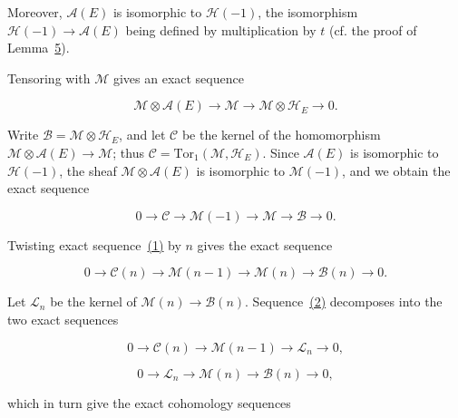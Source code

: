 Moreover, $\mathcal{A}(E)$ is isomorphic to $\mathcal{H}(-1)$, the isomorphism $\mathcal{H}(-1)\to\mathcal{A}(E)$ being defined by multiplication by $t$ (cf. the proof of Lemma~\hyperref[gaga:lemma:5]{5}).

Tensoring with $\mathcal{M}$ gives an exact sequence

\begin{equation*}
\mathcal{M}\otimes\mathcal{A}(E)\longrightarrow\mathcal{M}
\longrightarrow\mathcal{M}\otimes\mathcal{H}_E\longrightarrow0.
\end{equation*}

Write $\mathcal{B}=\mathcal{M}\otimes\mathcal{H}_E$, and let $\mathcal{C}$ be the kernel of the homomorphism $\mathcal{M}\otimes\mathcal{A}(E)\to\mathcal{M}$; thus $\mathcal{C}=\mathrm{Tor}_1(\mathcal{M},\mathcal{H}_E)$. Since $\mathcal{A}(E)$ is isomorphic to $\mathcal{H}(-1)$, the sheaf $\mathcal{M}\otimes\mathcal{A}(E)$ is isomorphic to $\mathcal{M}(-1)$, and we obtain the exact sequence

\begin{equation*}\tag{1}
0\longrightarrow\mathcal{C}\longrightarrow\mathcal{M}(-1)
\longrightarrow\mathcal{M}\longrightarrow\mathcal{B}\longrightarrow0.
\end{equation*}

Twisting exact sequence~\hyperref[gaga:eq:1]{(1)} by $n$ gives the exact sequence

\begin{equation*}\tag{2}
0\longrightarrow\mathcal{C}(n)\longrightarrow\mathcal{M}(n-1)
\longrightarrow\mathcal{M}(n)\longrightarrow\mathcal{B}(n)\longrightarrow0.
\end{equation*}

Let $\mathcal{L}_n$ be the kernel of $\mathcal{M}(n)\to\mathcal{B}(n)$. Sequence~\hyperref[gaga:eq:2]{(2)} decomposes into the two exact sequences

\begin{equation*}\tag{3}
0\longrightarrow\mathcal{C}(n)\longrightarrow\mathcal{M}(n-1)
\longrightarrow\mathcal{L}_n\longrightarrow0,
\end{equation*}

\begin{equation*}\tag{4}
0\longrightarrow\mathcal{L}_n\longrightarrow\mathcal{M}(n)
\longrightarrow\mathcal{B}(n)\longrightarrow0,
\end{equation*}

which in turn give the exact cohomology sequences

